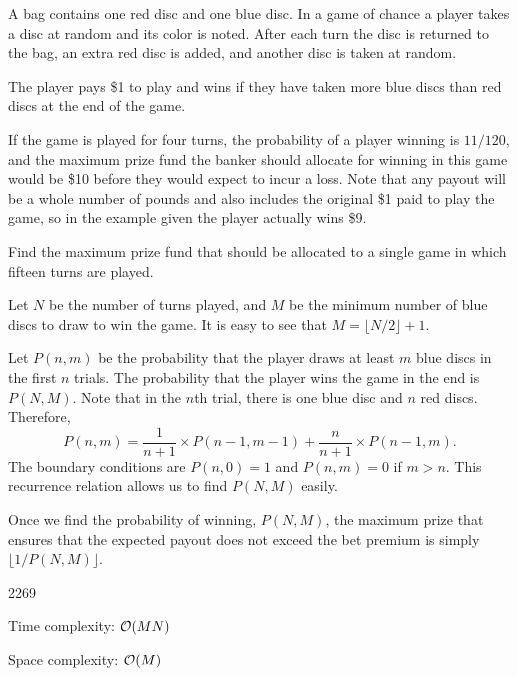 




A bag contains one red disc and one blue disc. In a game of chance a player takes a disc at random and its color is noted. After each turn the disc is returned to the bag, an extra red disc is added, and another disc is taken at random.

The player pays \$1 to play and wins if they have taken more blue discs than red discs at the end of the game.

If the game is played for four turns, the probability of a player winning is $11/120$, and the maximum prize fund the banker should allocate for winning in this game would be \$10 before they would expect to incur a loss. Note that any payout will be a whole number of pounds and also includes the original \$1 paid to play the game, so in the example given the player actually wins \$9.

Find the maximum prize fund that should be allocated to a single game in which fifteen turns are played.

\solution

Let $N$ be the number of turns played, and $M$ be the minimum number of blue discs to draw to win the game. It is easy to see that $M = \lfloor N/2 \rfloor + 1$.

Let $P(n,m)$ be the probability that the player draws at least $m$ blue discs in the first $n$ trials. The probability that the player wins the game in the end is $P(N,M)$. Note that in the $n$th trial, there is one blue disc and $n$ red discs. Therefore,
\[
P(n,m) = \frac{1}{n+1} \times P(n-1,m-1) + \frac{n}{n+1} \times P(n-1,m) .
\]
The boundary conditions are $P(n,0) = 1$ and $P(n,m)=0$ if $m > n$. This recurrence relation allows us to find $P(N,M)$ easily.

Once we find the probability of winning, $P(N,M)$, the maximum prize that ensures that the expected payout does not exceed the bet premium is simply $\lfloor 1/P(N,M) \rfloor$.

\answer

2269

\complexity

Time complexity: $\mathcal{O}(MN)$

Space complexity: $\mathcal{O}(M)$


